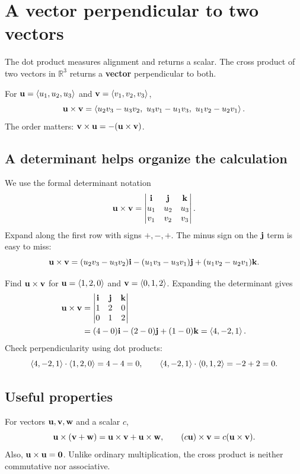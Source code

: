 \documentclass[11pt]{article}
\begin{document}

\section{A vector perpendicular to two vectors}
The dot product measures alignment and returns a scalar. The cross product
of two vectors in $\mathbb{R}^3$ returns a \textbf{vector} perpendicular to both.

\begin{definition}
For $\mathbf{u}=\left\langle u_1,u_2,u_3\right\rangle$ and $\mathbf{v}=\left\langle v_1,v_2,v_3\right\rangle$,
\[
 \mathbf{u}\times\mathbf{v}
 =\left\langle u_2v_3-u_3v_2,\ u_3v_1-u_1v_3,\ u_1v_2-u_2v_1\right\rangle.
\]
The order matters: $\mathbf{v}\times\mathbf{u}=-(\mathbf{u}\times\mathbf{v})$.
\end{definition}

\subsection*{A determinant helps organize the calculation}
We use the formal determinant notation
\[
 \mathbf{u}\times\mathbf{v}
 =\begin{vmatrix}
 \mathbf{i}&\mathbf{j}&\mathbf{k}\\
 u_1&u_2&u_3\\
 v_1&v_2&v_3
 \end{vmatrix}.
\]
Expand along the first row with signs $+,-,+$. The minus sign on the
$\mathbf{j}$ term is easy to miss:
\[
 \mathbf{u}\times\mathbf{v}
 =(u_2v_3-u_3v_2)\mathbf{i}
 -(u_1v_3-u_3v_1)\mathbf{j}
 +(u_1v_2-u_2v_1)\mathbf{k}.
\]

\begin{example}{Find $\mathbf{u}\times\mathbf{v}$ for
$\mathbf{u}=\left\langle 1,2,0\right\rangle$ and $\mathbf{v}=\left\langle 0,1,2\right\rangle$.}
Expanding the determinant gives
\begin{align*}
 \mathbf{u}\times\mathbf{v}
 &=\begin{vmatrix}\mathbf{i}&\mathbf{j}&\mathbf{k}\\1&2&0\\0&1&2\end{vmatrix}\\
 &=(4-0)\mathbf{i}-(2-0)\mathbf{j}+(1-0)\mathbf{k}=\left\langle 4,-2,1\right\rangle.
\end{align*}
Check perpendicularity using dot products:
\[
 \left\langle 4,-2,1\right\rangle\cdot\left\langle 1,2,0\right\rangle=4-4=0,\qquad
 \left\langle 4,-2,1\right\rangle\cdot\left\langle 0,1,2\right\rangle=-2+2=0.
\]
\end{example}

\subsection*{Useful properties}
For vectors $\mathbf{u},\mathbf{v},\mathbf{w}$ and a scalar $c$,
\[
 \mathbf{u}\times(\mathbf{v}+\mathbf{w})=\mathbf{u}\times\mathbf{v}+\mathbf{u}\times\mathbf{w},
 \qquad
 (c\mathbf{u})\times\mathbf{v}=c(\mathbf{u}\times\mathbf{v}).
\]
Also, $\mathbf{u}\times\mathbf{u}=\mathbf{0}$. Unlike ordinary multiplication, the cross
product is neither commutative nor associative.
\end{document}
